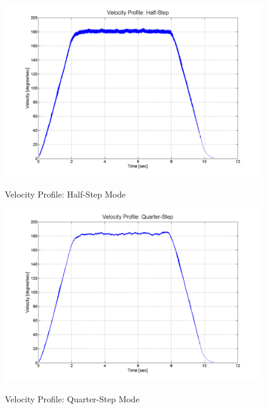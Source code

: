 \documentclass{article}
\theoremstyle{plain}
\theoremstyle{definition}
\theoremstyle{remark}
\begin{document}
\begin{figure}[h!]
\begin{center}
\includegraphics[width=12cm]{Q4_half_step.png}
\caption{Velocity Profile: Half-Step Mode} \label{tex}
\label{fig:q4_12}
\end{center}
\end{figure}

\begin{figure}[h!]
\begin{center}
\includegraphics[width=12cm]{Q4_quarter_step.png}
\caption{Velocity Profile: Quarter-Step Mode} \label{tex}
\label{fig:q4_13}
\end{center}
\end{figure}
\end{document}
